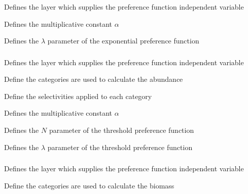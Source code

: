  {Defines the layer which supplies the preference function independent variable}

 {Defines the multiplicative constant $\alpha$}

 {Defines the $\lambda$ parameter of the exponential preference function}

\subsubsection[Threshold]{}

 {Defines the layer which supplies the preference function independent variable}

 {Define the categories are used to calculate the abundance}

 {Define the selectivities applied to each category}

 {Defines the multiplicative constant $\alpha$}

 {Defines the $N$ parameter of the threshold preference function}

 {Defines the $\lambda$ parameter of the threshold preference function}

\subsubsection[Threshold-biomass]{}

 {Defines the layer which supplies the preference function independent variable}

 {Define the categories are used to calculate the biomass}

